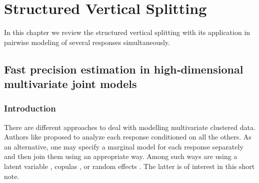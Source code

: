 \documentclass[11pt,a5paper,twoside]{book}
\begin{document}
\chapter{Structured Vertical Splitting}
\label{chap_structured_vertical}
In this chapter we review the structured vertical splitting with its application in pairwise modeling of several responses simultaneously. 

\section[Fast precision estimation]{Fast precision estimation in high‐dimensional multivariate joint models}


\subsection{Introduction}
\label{sec_intro}

There are different approaches to deal with modelling multivariate clustered data. Authors like \cite{pawitan1993} proposed to analyze each response conditioned on all the others. As an alternative, one may specify a marginal model for each response separately and then join them using an appropriate way. Among such ways are using a latent variable \citep{catalano1992}, copulas \citep{nelsen2007}, or random effects \citep{laird1982random}. The latter is of interest in this short note. 

\end{document}
